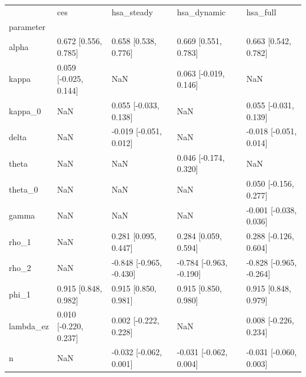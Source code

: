 \begin{tabular}{lllll}
\toprule
 & ces & hsa\_steady & hsa\_dynamic & hsa\_full \\
parameter &  &  &  &  \\
\midrule
alpha & 0.672 [0.556, 0.785] & 0.658 [0.538, 0.776] & 0.669 [0.551, 0.783] & 0.663 [0.542, 0.782] \\
kappa & 0.059 [-0.025, 0.144] & NaN & 0.063 [-0.019, 0.146] & NaN \\
kappa\_0 & NaN & 0.055 [-0.033, 0.138] & NaN & 0.055 [-0.031, 0.139] \\
delta & NaN & -0.019 [-0.051, 0.012] & NaN & -0.018 [-0.051, 0.014] \\
theta & NaN & NaN & 0.046 [-0.174, 0.320] & NaN \\
theta\_0 & NaN & NaN & NaN & 0.050 [-0.156, 0.277] \\
gamma & NaN & NaN & NaN & -0.001 [-0.038, 0.036] \\
rho\_1 & NaN & 0.281 [0.095, 0.447] & 0.284 [0.059, 0.594] & 0.288 [-0.126, 0.604] \\
rho\_2 & NaN & -0.848 [-0.965, -0.430] & -0.784 [-0.963, -0.190] & -0.828 [-0.965, -0.264] \\
phi\_1 & 0.915 [0.848, 0.982] & 0.915 [0.850, 0.981] & 0.915 [0.850, 0.980] & 0.915 [0.848, 0.979] \\
lambda\_ez & 0.010 [-0.220, 0.237] & 0.002 [-0.222, 0.228] & NaN & 0.008 [-0.226, 0.234] \\
n & NaN & -0.032 [-0.062, 0.001] & -0.031 [-0.062, 0.004] & -0.031 [-0.060, 0.003] \\
\bottomrule
\end{tabular}
